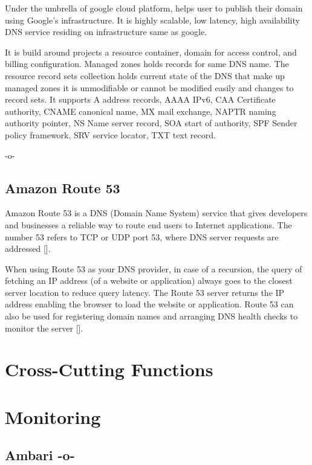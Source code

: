Under the umbrella of google cloud platform, helps user to publish
their domain using Google's infrastructure. It is highly scalable, low
latency, high availability DNS service residing on infrastructure same
as google.
   
It is build around projects a resource container, domain for access
control, and billing configuration. Managed zones holds records for
same DNS name. The resource record sets collection holds current state
of the DNS that make up managed zones it is unmodifiable or cannot be
modified easily and changes to record sets. It supports A address
records, AAAA IPv6, CAA Certificate authority, CNAME canonical name,
MX mail exchange, NAPTR naming authority pointer, NS Name server
record, SOA start of authority, SPF Sender policy framework, SRV
service locator, TXT text record.


     -o-

\subsection{Amazon Route 53}

Amazon Route 53 is a DNS (Domain Name System) service that gives
developers and businesses a reliable way to route end users to
Internet applications. The number 53 refers to TCP or UDP port 53,
where DNS server requests are addressed [\cite{www-ar53}].
     
When using Route 53 as your DNS provider, in case of a recursion, the
query of fetching an IP address (of a website or application) always
goes to the closest server location to reduce query latency. The Route
53 server returns the IP address enabling the browser to load the
website or application. Route 53 can also be used for registering
domain names and arranging DNS health checks to monitor the
server [\cite{www-amar53}].

\section{Cross-Cutting Functions}
\label{S:o-cross-cutting-functions}

\section{Monitoring}

\subsection{Ambari -o-}


